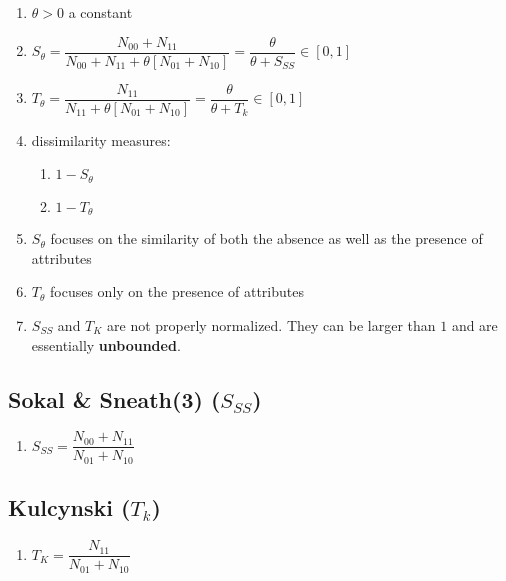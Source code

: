 \begin{enumerate}
    \item[] $\theta > 0$ a constant

    \item $
        S_\theta 
        = \dfrac{N_{00} + N_{11}}{N_{00} + N_{11} + \theta[N_{01} + N_{10}]}
        = \dfrac{\theta}{\theta + S_{SS}}
        \in [0,1]
    $

    \item $
        T_\theta
        = \dfrac{N_{11}}{N_{11} + \theta[N_{01} + N_{10}]}
        = \dfrac{\theta}{\theta + T_k}
        \in [0,1]
    $

    \item dissimilarity measures:
    \begin{enumerate}
        \item $1 - S_\theta$

        \item $1 - T_\theta$
    \end{enumerate}

    \item $S_\theta$ focuses on the similarity of both the absence as well as the presence of attributes

    \item $T_\theta$ focuses only on the presence of attributes

    \item $S_{SS}$ and $T_K$ are not properly normalized. They can be larger than $1$ and are essentially \textbf{unbounded}.

\end{enumerate}

\subsection{Sokal \& Sneath(3) ($S_{SS}$) \cite{ism-1}}\label{Sokal and Sneath(3)}

\begin{enumerate}
    \item[] $S_{SS} = \dfrac{N_{00} + N_{11}}{N_{01} + N_{10}}$

\end{enumerate}

\subsection{Kulcynski ($T_k$) \cite{ism-1}}\label{Kulcynski}

\begin{enumerate}
    \item[] $T_K = \dfrac{N_{11}}{N_{01} + N_{10}}$
\end{enumerate}

